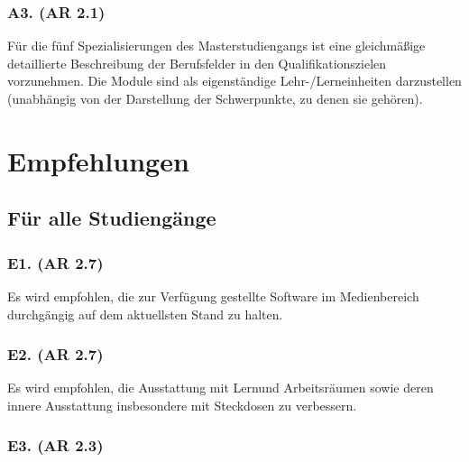 \subsection{A3. (AR 2.1)
\label{/mi-2017/selbstbericht/auflagen/0000-auflagen}}\label{a3.-ar-2.1-pathlabelmi-2017selbstberichtauflagen0000-auflagen}

Für die fünf Spezialisierungen des Masterstudiengangs ist eine
gleichmäßige detaillierte Beschreibung der Berufsfelder in den
Qualifikationszielen vorzunehmen. Die Module sind als eigenständige
Lehr-/Lerneinheiten darzustellen (unabhängig von der Darstellung der
Schwerpunkte, zu denen sie gehören).

\chapter{Empfehlungen\label{/mi-2017/selbstbericht/auflagen/0000-auflagen}}\label{empfehlungenpathlabelmi-2017selbstberichtauflagen0000-auflagen}

\section{Für alle
Studiengänge\label{/mi-2017/selbstbericht/auflagen/0000-auflagen}}\label{fuxfcr-alle-studienguxe4ngepathlabelmi-2017selbstberichtauflagen0000-auflagen}

\subsection{E1. (AR 2.7)
\label{/mi-2017/selbstbericht/auflagen/0000-auflagen}}\label{e1.-ar-2.7-pathlabelmi-2017selbstberichtauflagen0000-auflagen}

Es wird empfohlen, die zur Verfügung gestellte Software im Medienbereich
durchgängig auf dem aktuellsten Stand zu halten.

\subsection{E2. (AR 2.7)
\label{/mi-2017/selbstbericht/auflagen/0000-auflagen}}\label{e2.-ar-2.7-pathlabelmi-2017selbstberichtauflagen0000-auflagen}

Es wird empfohlen, die Ausstattung mit Lernund Arbeitsräumen sowie deren
innere Ausstattung insbesondere mit Steckdosen zu verbessern.

\subsection{E3. (AR 2.3)
\label{/mi-2017/selbstbericht/auflagen/0000-auflagen}}\label{e3.-ar-2.3-pathlabelmi-2017selbstberichtauflagen0000-auflagen}

